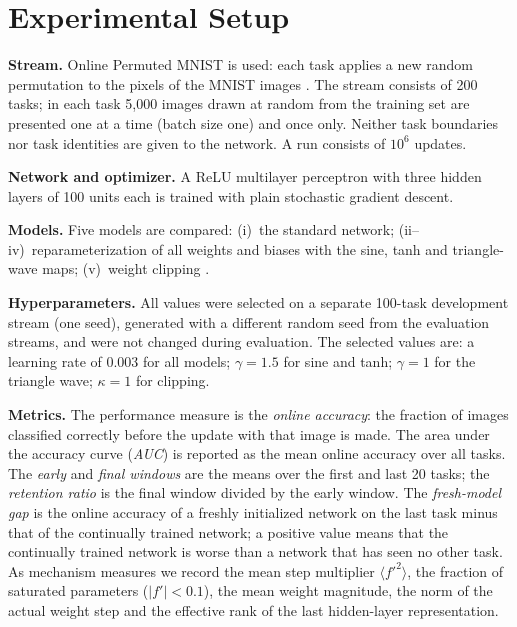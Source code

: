 \documentclass[conference,a4paper]{IEEEtran}
\begin{document}
\section{Experimental Setup}

\textbf{Stream.} Online Permuted MNIST \cite{goodfellow2013empirical,zenke2017continual,dohare2024loss} is used:
each task applies a new random permutation to the pixels of the MNIST images \cite{lecun1998gradient}. The
stream consists of 200 tasks; in each task 5,000 images drawn at random from the training set are presented one
at a time (batch size one) and once only. Neither task boundaries nor task identities are given to the network.
A run consists of $10^6$ updates.

\textbf{Network and optimizer.} A ReLU multilayer perceptron with three hidden layers of 100 units each is
trained with plain stochastic gradient descent.

\textbf{Models.} Five models are compared: (i)~the standard network; (ii--iv)~reparameterization of all weights and biases with the sine,
tanh and triangle-wave maps; (v)~weight clipping \cite{elsayed2024weight}.

\textbf{Hyperparameters.} All values were selected on a separate 100-task development stream (one seed), generated with a different random seed from the evaluation streams, and were not changed during evaluation. The selected values are: a
learning rate of 0.003 for all models; $\gamma=1.5$ for sine and tanh; $\gamma=1$ for the triangle wave;
$\kappa=1$ for clipping.

\textbf{Metrics.} The performance measure is the \emph{online accuracy}: the fraction of images classified
correctly before the update with that image is made. The area under the accuracy curve (\emph{AUC}) is reported as the mean online accuracy over all tasks.
The \emph{early} and \emph{final windows} are the means over the first and last 20 tasks; the \emph{retention
ratio} is the final window divided by the early window. The \emph{fresh-model gap} is the online accuracy of a
freshly initialized network on the last task minus that of the continually trained network; a positive value
means that the continually trained network is worse than a network that has seen no other task. As mechanism
measures we record the mean step multiplier $\langle f'^2\rangle$, the fraction of saturated parameters
($|f'|<0.1$), the mean weight magnitude, the norm of the actual weight step and the effective rank
\cite{roy2007effective} of the last hidden-layer representation.
\end{document}
